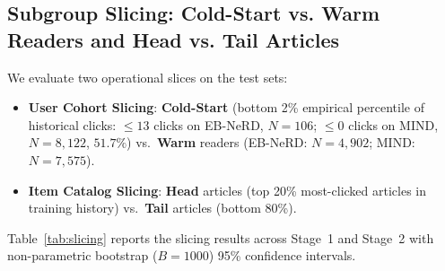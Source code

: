 \documentclass[11pt,a4paper]{article}
\begin{document}
\subsection{Subgroup Slicing: Cold-Start vs. Warm Readers and Head vs. Tail Articles}

We evaluate two operational slices on the test sets:
\begin{itemize}
  \item \textbf{User Cohort Slicing}: \textbf{Cold-Start} (bottom 2\% empirical percentile of historical clicks: $\le 13$ clicks on EB-NeRD, $N{=}106$; $\le 0$ clicks on MIND, $N{=}8,122$, $51.7\%$) vs.\ \textbf{Warm} readers (EB-NeRD: $N{=}4,902$; MIND: $N{=}7,575$).
  \item \textbf{Item Catalog Slicing}: \textbf{Head} articles (top 20\% most-clicked articles in training history) vs.\ \textbf{Tail} articles (bottom 80\%).
\end{itemize}

Table~\ref{tab:slicing} reports the slicing results across Stage~1 and Stage~2 with non-parametric bootstrap ($B{=}1000$) 95\% confidence intervals.
\end{document}
